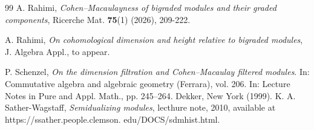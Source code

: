 \documentclass[10pt,a4paper]{amsart}
\numberwithin{equation}{theorem}
\theoremstyle{definition}
\theoremstyle{fact}
\theoremstyle{conjecture}
\begin{document}
\begin{thebibliography}{99}
 A. Rahimi, \textit{Cohen--Macaulayness of bigraded modules and their graded components}, Ricerche Mat. \textbf{75}(1) (2026), 209-222.

 A. Rahimi, \textit{On cohomological dimension and height relative to bigraded modules}, J. Algebra Appl., to appear.

P. Schenzel, \textit{On the dimension filtration and Cohen–Macaulay filtered modules}. In: Commutative algebra and algebraic
geometry (Ferrara), vol. 206. In: Lecture Notes in Pure and Appl. Math., pp. 245–264. Dekker, New York (1999).
 {K. A. Sather-Wagstaff}, {\it Semidualizing modules}, lecthure note, 2010, available at https://ssather.people.clemson. edu/DOCS/sdmhist.html.


\end{thebibliography}
\end{document}
